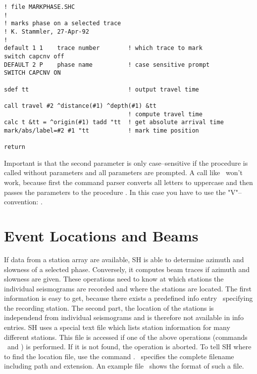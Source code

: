 \begin{verbatim}
! file MARKPHASE.SHC
!
! marks phase on a selected trace
! K. Stammler, 27-Apr-92
!
default 1 1    trace number        ! which trace to mark
switch capcnv off
DEFAULT 2 P    phase name          ! case sensitive prompt
SWITCH CAPCNV ON

sdef tt                            ! output travel time

call travel #2 ^distance(#1) ^depth(#1) &tt
                                   ! compute travel time
calc t &tt = ^origin(#1) tadd "tt  ! get absolute arrival time
mark/abs/label=#2 #1 "tt           ! mark time position

return
\end{verbatim}

Important is that the second parameter is only case--sensitive
if the procedure is called without parameters and all parameters
are prompted.  A call like \ won't work,
because first the command parser converts all letters to uppercase
and then passes the parameters to the procedure .
In this case you have to use the "V"--convention: .



\section{Event Locations and Beams}

If data from a station array are available, SH is able to determine
azimuth and slowness of a selected phase.  Conversely, it computes
beam traces if azimuth and slowness are given.  These operations
need to know at which stations the individual seismograms are
recorded and where the stations are located.  The first information
is easy to get, because there exists a predefined info entry
\ specifying the recording station.  The second part,
the location of the stations is independend from individual
seismograms and is therefore not available in info entries.  SH
uses a special text file which lists station information for
many different stations.  This file is accessed if one of the
above operations (commands \ and ) is
performed.  If it is not found, the operation is aborted.  To tell
SH where to find the location file, use the command
.  \ specifies the complete
filename including path and extension.  An example file
\ shows the format of such a file.

